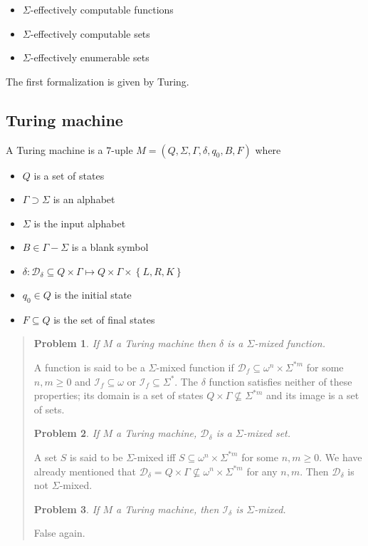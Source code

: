 \documentclass[a4paper, 12pt]{article}
\newtheorem{problem}{Problem}
\newtheorem{problem}{Problem}
\begin{document}
\begin{itemize}
    \item $\Sigma$-effectively computable functions
    \item $\Sigma$-effectively computable sets
    \item $\Sigma$-effectively enumerable sets
\end{itemize}

The first formalization is given by Turing.

\subsection{Turing machine}

A Turing machine is a $7$-uple $M = \left( Q, \Sigma, \Gamma, \delta, q_0, B, F
\right) $ where

\begin{itemize}
    \item $Q$ is a set of states 
    \item $\Gamma \supset \Sigma$ is an alphabet
    \item $\Sigma$ is the input alphabet
    \item $B \in \Gamma - \Sigma$ is a blank symbol 
    \item $\delta : \mathcal{D}_\delta\subseteq Q \times \Gamma \mapsto Q \times \Gamma \times \left\{
        L, R, K\right\}   $ 
    \item $q_0 \in Q$ is the initial state 
    \item $F \subseteq Q$ is the set of final states
\end{itemize}


\small
\begin{quote}

\begin{problem}
    If $M$ a Turing machine then $\delta$ is a $\Sigma$-mixed function.
\end{problem}

A function is said to be a $\Sigma$-mixed function if $\mathcal{D}_f \subseteq
\omega^n \times \Sigma^{*m}$ for some $n, m \geq 0$ and $\mathcal{I}_f \subseteq
\omega$ or $\mathcal{I}_f \subseteq \Sigma^{*}$. The $\delta$ function satisfies
neither of these properties; its domain is a set of states $Q \times \Gamma \not\subseteq
\Sigma^{*m}$ and its image is a set of sets.

\begin{problem}
    If $M$ a Turing machine, $\mathcal{D}_{\delta}$ is a $\Sigma$-mixed set.
\end{problem}

A set $S$ is said to be $\Sigma$-mixed iff $S \subseteq \omega^n \times
\Sigma^{*m}$ for some $n, m \geq 0$. We have already mentioned that
$\mathcal{D}_\delta = Q \times \Gamma \not\subseteq \omega^n \times \Sigma^{*m}$ for any $n,
m$. Then $\mathcal{D}_\delta$ is not $\Sigma$-mixed.

\begin{problem}
    If $M$ a Turing machine, then $\mathcal{I}_{\delta}$ is $\Sigma$-mixed.
\end{problem}

False again.

\end{quote}
\normalsize
\end{document}
